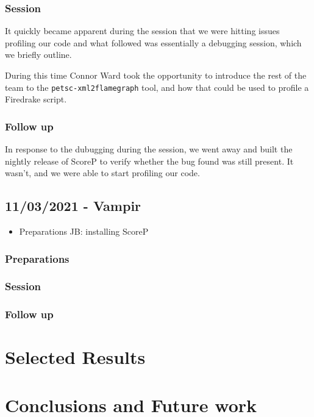 \documentclass[a4paper,11pt]{article}
\newenvironment{jacknotes}{\color{red}\renewcommand{\labelitemi}{$\star$}\begin{itemize}}{\end{itemize}}
\begin{document}
\subsubsection*{Session}
It quickly became apparent during the session that we were hitting issues profiling our code and what followed was essentially a debugging session, which we briefly outline.

During this time Connor Ward took the opportunity to introduce the rest of the team to the \verb`petsc-xml2flamegraph` tool, and how that could be used to profile a Firedrake script.

\subsubsection*{Follow up}
In response to the dubugging during the session, we went away and built the nightly release of ScoreP to verify whether the bug found was still present.
It wasn't, and we were able to start profiling our code.

\clearpage
\subsection{11/03/2021 - Vampir}
\label{ssec:vampir}
\begin{jacknotes}
	\item Preparations JB: installing ScoreP
\end{jacknotes}
\subsubsection*{Preparations}

\subsubsection*{Session}

\subsubsection*{Follow up}

\clearpage
\section{Selected Results}
\label{sec:results}


\clearpage
\section{Conclusions and Future work}
\label{sec:conc}
\end{document}
